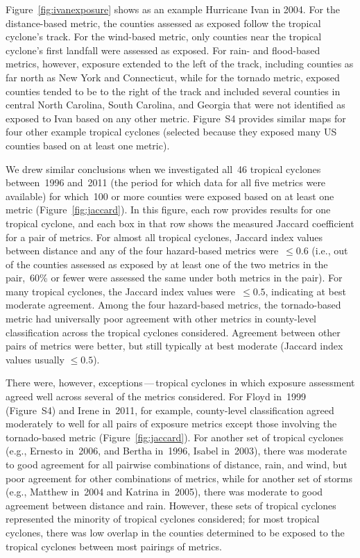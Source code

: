 Figure~\ref{fig:ivanexposure} shows as an example Hurricane Ivan in 2004.
For the distance-based metric, the counties assessed as exposed follow the
tropical cyclone's track. For the wind-based metric,
only counties near the tropical cyclone's first landfall were assessed as
exposed. For rain- and flood-based metrics, however, exposure extended to the
left of the track, including counties as far north as New York and Connecticut,
while for the tornado metric, exposed counties tended to be to the right of the
track and included several counties in central North Carolina, South Carolina,
and Georgia that were not identified as exposed to Ivan based on any other
metric. Figure~S4 provides similar maps for four other example tropical
cyclones (selected because they exposed many \ac{US}  counties based on at
least one metric).

We drew similar conclusions when we investigated all~46 tropical cyclones
between~1996 and~2011 (the period for which data for all five metrics were
available) for which~100 or more counties were exposed based on at least one
metric (Figure~\ref{fig:jaccard}). In this figure, each row provides results
for one tropical cyclone, and each box in that row shows the measured Jaccard
coefficient for a pair of metrics.  For almost all tropical cyclones, Jaccard
index values between distance and any of the four hazard-based metrics
were~$\le0.6$ (i.e., out of the counties assessed as exposed by at least one of
the two metrics in the pair,~60\si{\percent} or fewer were assessed the same
under both metrics in the pair). For many tropical cyclones, the Jaccard index
values were~$\le0.5$, indicating at best moderate agreement.  Among the four
hazard-based metrics, the tornado-based metric had universally poor agreement
with other metrics in county-level classification across the tropical cyclones
considered.  Agreement between other pairs of metrics were better, but still
typically at best moderate (Jaccard index values usually $\le0.5$).

There were, however, exceptions\,---\,tropical cyclones in which exposure
assessment agreed well across several of the metrics considered.  For Floyd
in~1999 (Figure~S4) and Irene in~2011, for example, county-level classification
agreed moderately to well for all pairs of exposure metrics except those
involving the tornado-based metric (Figure~\ref{fig:jaccard}). For another set
of tropical cyclones (e.g., Ernesto in~2006, and Bertha in~1996, Isabel
in~2003), there was moderate to good agreement for all pairwise combinations of
distance, rain, and wind, but poor agreement for other combinations of
metrics, while for another set of storms (e.g., Matthew in~2004 and Katrina
in~2005), there was moderate to good agreement between distance and rain.
However, these sets of tropical cyclones represented the minority of tropical
cyclones considered; for most tropical cyclones, there was low overlap in the
counties determined to be exposed to the tropical cyclones between most
pairings of metrics.



